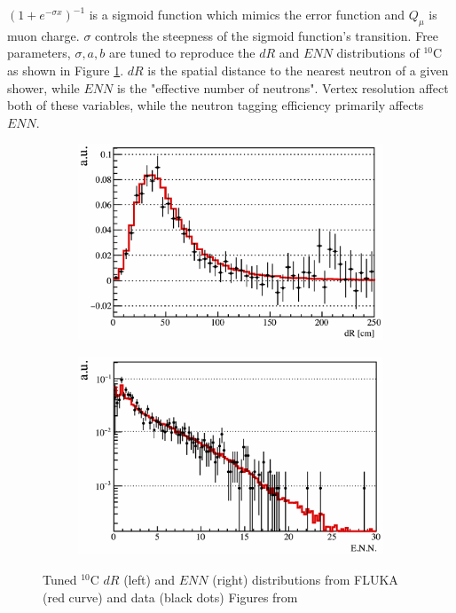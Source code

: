 $(1+e^{-\sigma x})^{-1}$ is a sigmoid function which mimics the error function and $Q_{\mu}$ is muon charge. $\sigma$ controls the steepness of the sigmoid function's transition. Free parameters, $\sigma, a, b$ are tuned to reproduce the $dR$ and $ENN$ distributions of $^{10}$C as shown in Figure \ref{fig:fluka_tuning}. $dR$ is the spatial distance to the nearest neutron of a given shower, while $ENN$ is the "effective number of neutrons". Vertex resolution affect both of these variables, while the neutron tagging efficiency primarily affects $ENN$.
\begin{figure}[htb]
        \centering
    \begin{subfigure}[b]{0.48\textwidth}
        \centering
        \includegraphics[width=\textwidth]{c10_tune_dR.png}
    \end{subfigure}
    \hfill
    \begin{subfigure}[b]{0.48\textwidth}
        \centering
        \includegraphics[width=\textwidth]{c10_tune_ENN.png}
    \end{subfigure}
    
    \caption{Tuned $^{10}$C $dR$ (left) and $ENN$ (right) distributions from FLUKA (red curve) and data (black dots) Figures from \cite{miyake_phd}}
    \label{fig:fluka_tuning}
\end{figure}